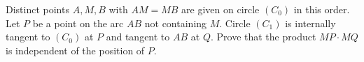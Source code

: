 Distinct points $ A,M,B$ with $ AM = MB$ are given on circle $ (C_0)$ in this order. Let $ P$ be a point on the arc $ AB$ not containing $ M$. Circle $ (C_1)$ is internally tangent to $ (C_0)$ at $ P$ and tangent to $ AB$ at $ Q$. Prove that the product $ MP\cdot MQ$ is independent of the position of $ P$.